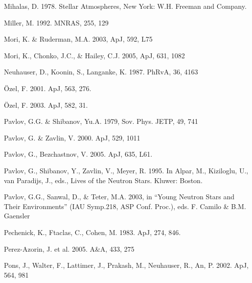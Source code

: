 \documentclass[useAMS,onecolumn,usenatbib,usegraphicx]{mn2e}
\begin{document}
\begin{thebibliography}{}
Mihalas, D. 1978. Stellar Atmospheres, New York: W.H. Freeman and Company.

Miller, M. 1992. MNRAS, 255, 129

Mori, K. \& Ruderman, M.A. 2003, ApJ, 592, L75

Mori, K., Chonko, J.C., \& Hailey, C.J. 2005, ApJ, 631, 1082

Neuhauser, D., Koonin, S., Langanke, K. 1987. PhRvA, 36, 4163

\"{O}zel, F. 2001. ApJ, 563, 276.

\"{O}zel, F. 2003. ApJ, 582, 31.

Pavlov, G.G. \& Shibanov, Yu.A. 1979, Sov. Phys. JETP, 49, 741

Pavlov, G. \& Zavlin, V. 2000. ApJ, 529, 1011

Pavlov, G., Bezchastnov, V. 2005. ApJ, 635, L61.

Pavlov, G., Shibanov, Y., Zavlin, V., Meyer, R. 1995. In Alpar, M., Kiziloglu, U., van Paradijs, J., eds., 
Lives of the Neutron Stars.  Kluwer: Boston.

Pavlov, G.G., Sanwal, D., \& Teter, M.A. 2003, in ``Young Neutron Stars
and Their Environments'' (IAU Symp.218, ASP Conf. Proc.), eds. F. Camilo
\& B.M. Gaensler

Pechenick, K., Ftaclas, C., Cohen, M. 1983. ApJ, 274, 846.

Perez-Azorin, J. et al. 2005. A\&A, 433, 275

Pons, J., Walter, F., Lattimer, J., Prakash, M., Neuhauser, R., An, P. 2002. ApJ, 564, 981


\end{thebibliography}
\end{document}
